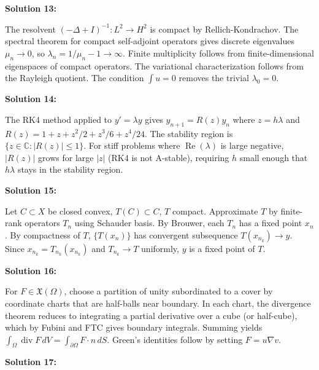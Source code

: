 \documentclass[12pt,a4paper]{exam}
\begin{document}
\vspace{0.5cm}

\textbf{Solution 13:}

The resolvent $(-\Delta + I)^{-1}: L^2 \to H^2$ is compact by Rellich-Kondrachov. The spectral theorem for compact self-adjoint operators gives discrete eigenvalues $\mu_n \to 0$, so $\lambda_n = 1/\mu_n - 1 \to \infty$. Finite multiplicity follows from finite-dimensional eigenspaces of compact operators. The variational characterization follows from the Rayleigh quotient. The condition $\int u = 0$ removes the trivial $\lambda_0 = 0$.

\vspace{0.5cm}

\textbf{Solution 14:}

The RK4 method applied to $y' = \lambda y$ gives $y_{n+1} = R(z) y_n$ where $z = h\lambda$ and $R(z) = 1 + z + z^2/2 + z^3/6 + z^4/24$. The stability region is $\{z \in \mathbb{C}: |R(z)| \leq 1\}$. For stiff problems where $\operatorname{Re}(\lambda)$ is large negative, $|R(z)|$ grows for large $|z|$ (RK4 is not A-stable), requiring $h$ small enough that $h\lambda$ stays in the stability region.

\vspace{0.5cm}

\textbf{Solution 15:}

Let $C \subset X$ be closed convex, $T(C) \subset C$, $T$ compact. Approximate $T$ by finite-rank operators $T_n$ using Schauder basis. By Brouwer, each $T_n$ has a fixed point $x_n$. By compactness of $T$, $\{T(x_n)\}$ has convergent subsequence $T(x_{n_k}) \to y$. Since $x_{n_k} = T_{n_k}(x_{n_k})$ and $T_{n_k} \to T$ uniformly, $y$ is a fixed point of $T$.

\vspace{0.5cm}

\textbf{Solution 16:}

For $F \in \mathfrak{X}(\Omega)$, choose a partition of unity subordinated to a cover by coordinate charts that are half-balls near boundary. In each chart, the divergence theorem reduces to integrating a partial derivative over a cube (or half-cube), which by Fubini and FTC gives boundary integrals. Summing yields $\int_\Omega \operatorname{div} F \, dV = \int_{\partial\Omega} F \cdot n \, dS$. Green's identities follow by setting $F = u \nabla v$.

\vspace{0.5cm}

\textbf{Solution 17:}
\end{document}
